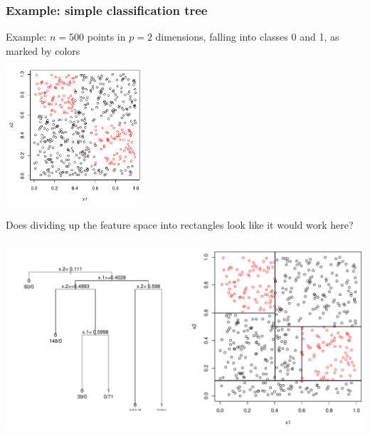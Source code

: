 \documentclass[mathserif]{beamer}
\begin{document}
\begin{frame}
\frametitle{Example: simple classification tree}
Example: $n=500$ points in $p=2$ dimensions, falling into classes 
0 and 1, as marked by colors

\smallskip
\begin{center}
\includegraphics[width=2in]{simpledata.pdf}
\end{center}

\vspace{-4pt}
Does dividing up the feature space into rectangles look like it
would work here?
\end{frame}

\begin{frame}
\frametitle{}
\bigskip
\includegraphics[width=\textwidth]{simpletree.pdf}
\end{frame}

\end{document}
